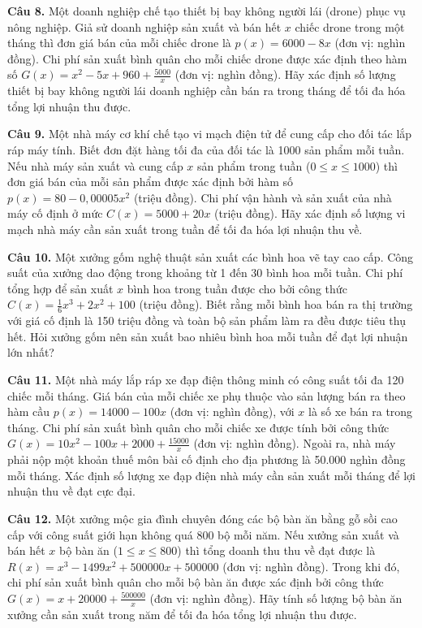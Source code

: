 \documentclass[12pt]{article}
\begin{document}
	\vspace{0.6cm}
	\noindent \textbf{Câu 8.} Một doanh nghiệp chế tạo thiết bị bay không người lái (drone) phục vụ nông nghiệp. Giả sử doanh nghiệp sản xuất và bán hết $x$ chiếc drone trong một tháng thì đơn giá bán của mỗi chiếc drone là $p(x) = 6000 - 8x$ (đơn vị: nghìn đồng). Chi phí sản xuất bình quân cho mỗi chiếc drone được xác định theo hàm số $G(x) = x^2 - 5x + 960 + \frac{5000}{x}$ (đơn vị: nghìn đồng). Hãy xác định số lượng thiết bị bay không người lái doanh nghiệp cần bán ra trong tháng để tối đa hóa tổng lợi nhuận thu được.
	
	\noindent \textbf{Câu 9.} Một nhà máy cơ khí chế tạo vi mạch điện tử để cung cấp cho đối tác lắp ráp máy tính. Biết đơn đặt hàng tối đa của đối tác là 1000 sản phẩm mỗi tuần. Nếu nhà máy sản xuất và cung cấp $x$ sản phẩm trong tuần ($0 \le x \le 1000$) thì đơn giá bán của mỗi sản phẩm được xác định bởi hàm số $p(x) = 80 - 0,00005x^2$ (triệu đồng). Chi phí vận hành và sản xuất của nhà máy cố định ở mức $C(x) = 5000 + 20x$ (triệu đồng). Hãy xác định số lượng vi mạch nhà máy cần sản xuất trong tuần để tối đa hóa lợi nhuận thu về.
	
	\vspace{0.6cm}
	\noindent \textbf{Câu 10.} Một xưởng gốm nghệ thuật sản xuất các bình hoa vẽ tay cao cấp. Công suất của xưởng dao động trong khoảng từ 1 đến 30 bình hoa mỗi tuần. Chi phí tổng hợp để sản xuất $x$ bình hoa trong tuần được cho bởi công thức $C(x) = \frac{1}{6}x^3 + 2x^2 + 100$ (triệu đồng). Biết rằng mỗi bình hoa bán ra thị trường với giá cố định là 150 triệu đồng và toàn bộ sản phẩm làm ra đều được tiêu thụ hết. Hỏi xưởng gốm nên sản xuất bao nhiêu bình hoa mỗi tuần để đạt lợi nhuận lớn nhất?
	
	\vspace{0.6cm}
	\noindent \textbf{Câu 11.} Một nhà máy lắp ráp xe đạp điện thông minh có công suất tối đa 120 chiếc mỗi tháng. Giá bán của mỗi chiếc xe phụ thuộc vào sản lượng bán ra theo hàm cầu $p(x) = 14000 - 100x$ (đơn vị: nghìn đồng), với $x$ là số xe bán ra trong tháng. Chi phí sản xuất bình quân cho mỗi chiếc xe được tính bởi công thức $G(x) = 10x^2 - 100x + 2000 + \frac{15000}{x}$ (đơn vị: nghìn đồng). Ngoài ra, nhà máy phải nộp một khoản thuế môn bài cố định cho địa phương là 50.000 nghìn đồng mỗi tháng. Xác định số lượng xe đạp điện nhà máy cần sản xuất mỗi tháng để lợi nhuận thu về đạt cực đại.
	
	\vspace{0.6cm}
	\noindent \textbf{Câu 12.} Một xưởng mộc gia đình chuyên đóng các bộ bàn ăn bằng gỗ sồi cao cấp với công suất giới hạn không quá 800 bộ mỗi năm. Nếu xưởng sản xuất và bán hết $x$ bộ bàn ăn ($1 \le x \le 800$) thì tổng doanh thu thu về đạt được là $R(x) = x^3 - 1499x^2 + 500000x + 500000$ (đơn vị: nghìn đồng). Trong khi đó, chi phí sản xuất bình quân cho mỗi bộ bàn ăn được xác định bởi công thức $G(x) = x + 20000 + \frac{500000}{x}$ (đơn vị: nghìn đồng). Hãy tính số lượng bộ bàn ăn xưởng cần sản xuất trong năm để tối đa hóa tổng lợi nhuận thu được.
	
\end{document}
